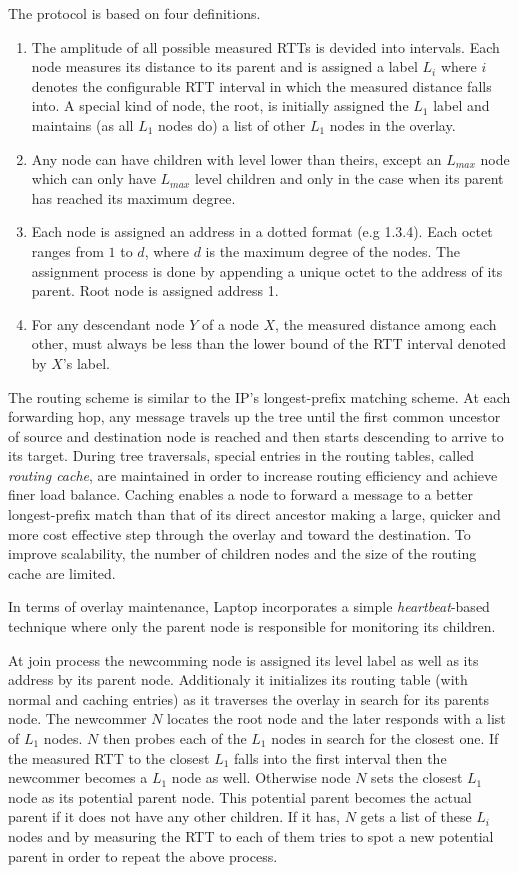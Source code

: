 \documentclass[a4paper,10pt]{article}
\begin{document}
The protocol is based on four definitions.
\begin{enumerate}
 \item The amplitude of all possible measured RTTs is devided into intervals. Each node measures its distance to its parent and is assigned a label $L_i$ where $i$ denotes the configurable RTT interval in which the measured distance falls into. A special kind of node, the root, is initially assigned the $L_1$ label and maintains (as all $L_1$ nodes do) a list of other $L_1$ nodes in the overlay.
 \item Any node can have children with level lower than theirs, except an $L_{max}$ node which can only have $L_{max}$ level children and only in the case when its parent has reached its maximum degree.
 \item Each node is assigned an address in a dotted format (e.g 1.3.4). Each octet ranges from $1$ to $d$, where $d$ is the maximum degree of the nodes. The assignment process is done by appending a unique octet to the address of its parent. Root node is assigned address 1.
 \item For any descendant node $Y$ of a node $X$, the measured distance among each other, must always be less than the lower bound of the RTT interval denoted by $X$'s label.
\end{enumerate}

The routing scheme is similar to the IP's longest-prefix matching scheme. At each forwarding hop, any message travels up the tree until the first common uncestor of source and destination node is reached and then starts descending to arrive to its target. During tree traversals, special entries in the routing tables, called \emph{routing cache}, are maintained in order to increase routing efficiency and achieve finer load balance. Caching enables a node to forward a message to a better longest-prefix match than that of its direct ancestor making a large, quicker and more cost effective step through the overlay and toward the destination. To improve scalability, the number of children nodes and the size of the routing cache are limited.

In terms of overlay maintenance, Laptop incorporates a simple \emph{heartbeat}-based technique where only the parent node is responsible for monitoring its children.

At join process the newcomming node is assigned its level label as well as its address by its parent node. Additionaly it initializes its routing table (with normal and caching entries) as it traverses the overlay in search for its parents node.
The newcommer $N$ locates the root node and the later responds with a list of $L_1$ nodes. $N$ then probes each of the $L_1$ nodes in search for the closest one. If the measured RTT to the closest $L_1$ falls into the first interval then the newcommer becomes a $L_1$ node as well. Otherwise node $N$ sets the closest $L_1$ node as its potential parent node. This potential parent becomes the actual parent if it does not have any other children. If it has, $N$ gets a list of these $L_i$ nodes and by measuring the RTT to each of them tries to spot a new potential parent in order to repeat the above process.
\end{document}
